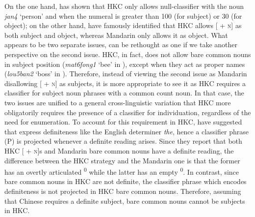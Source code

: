 \documentclass[output=paper]{langsci/langscibook}
\begin{document}
On the one hand,  has shown that \gls{HKC} only allows null-classifier  with the noun
\emph{jan4} ‘person’ and when the numeral is greater than 100 (for subject) or
30 (for object); on the other hand, \citet{ChengSybesma1999} have famously
identified that \gls{HKC} allows [\Clf{} + \textsc{n}]
as both subject and object, whereas Mandarin only allows it as
object.  What appears to be two separate issues, can be rethought as one if we
take another perspective on the second issue. \gls{HKC}, in fact, does not allow bare common nouns in subject position
(\emph{mat6fong1} \enquote*{bee} in ), except when they act as
proper names (\emph{lou5ban2} \enquote*{boss} in ).  Therefore,
instead of viewing the second issue as Mandarin disallowing
[\Clf{} + \textsc{n}] as subjects, it is more appropriate to see it as
\gls{HKC} requires a classifier for
subject noun phrases with a common count noun. In that case, the two issues are
unified to a general cross-linguistic variation that \gls{HKC} more obligatorily requires the presence of a
classifier for individuation, regardless of the need for
enumeration. To account for this requirement in \gls{HKC}, \citet{ChengSybesma1999} have suggested that 
express definiteness like the English determiner \emph{the}, hence a
classifier phrase (\Clf{}P) is projected whenever a definite
reading arises. Since they report that both \gls{HKC} [\Clf{} + \textsc{n}]s
and Mandarin bare common nouns have a definite reading, the
difference between the \gls{HKC} strategy and the
Mandarin one is that the former has an overtly articulated
\Clf{}\textsuperscript{0} while the latter has an empty
\Clf{}\textsuperscript{0}. In contrast, since bare common nouns in \gls{HKC}
are not definite, the classifier phrase which encodes
definiteness is not projected in \gls{HKC} bare common
nouns. Therefore, assuming that Chinese requires a definite subject, bare
common nouns cannot be subjects in \gls{HKC}.
\end{document}
